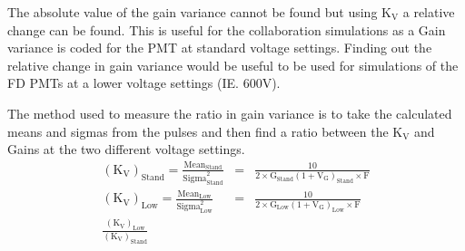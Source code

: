The absolute value of the gain variance cannot be found but using K$_{\mathrm{V}}$ a relative change can be found. This is useful for the collaboration simulations as a Gain variance is coded for the PMT at standard voltage settings. Finding out the relative change in gain variance would be useful to be used for simulations of the FD PMTs at a lower voltage settings (IE. 600V).

The method used to measure the ratio in gain variance is to take the calculated means and sigmas from the pulses and then find a ratio between the K$_{\mathrm{V}}$ and Gains at the two different voltage settings.
\begin{eqnarray}
\left(\mathrm{K}_{\mathrm{V}}\right)_{\mathrm{Stand}} = \frac{\mathrm{Mean}_{\mathrm{Stand}}}{\mathrm{Sigma}^2_{\mathrm{Stand}}} &=& \frac{10}{2 \times \mathrm{G}_{\mathrm{Stand}} (1 + \mathrm{V}_{\mathrm{G}})_{\mathrm{Stand}} \times \mathrm{F}} \\
\left(\mathrm{K}_{\mathrm{V}}\right)_{\mathrm{Low}} = \frac{\mathrm{Mean}_{\mathrm{Low}}}{\mathrm{Sigma}^2_{\mathrm{Low}}} &=& \frac{10}{2 \times \mathrm{G}_{\mathrm{Low}} (1 + \mathrm{V}_{\mathrm{G}})_{\mathrm{Low}} \times \mathrm{F}} \\
\frac{\left(\mathrm{K}_{\mathrm{V}}\right)_{\mathrm{Low}}}{\left(\mathrm{K}_{\mathrm{V}}\right)_{\mathrm{Stand}}}
\end{eqnarray}

